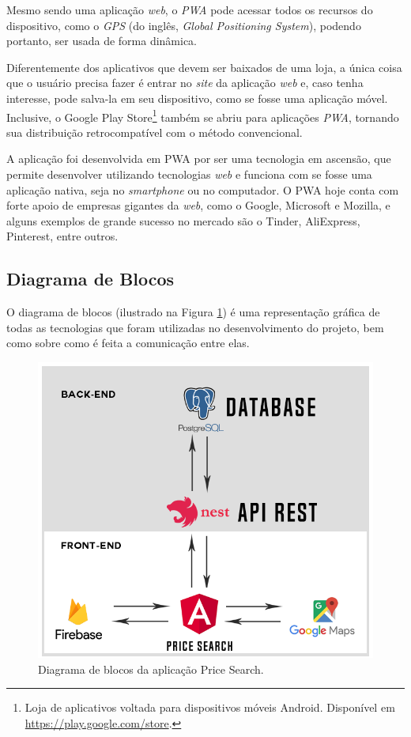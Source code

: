 Mesmo sendo uma aplicação \textit{web}, o \textit{PWA} pode acessar todos os recursos do dispositivo, como o \textit{GPS} (do inglês, \textit{Global Positioning System}), podendo portanto, ser usada de forma dinâmica.

Diferentemente dos aplicativos que devem ser baixados de uma loja, a única coisa que o usuário precisa fazer é entrar no \textit{site} da aplicação \textit{web} e, caso tenha interesse, pode salva-la em seu dispositivo, como se fosse uma aplicação móvel. Inclusive, o Google Play Store\footnote{Loja de aplicativos voltada para dispositivos móveis Android. Disponível em \url{https://play.google.com/store}.} também se abriu para aplicações \textit{PWA}, tornando sua distribuição retrocompatível com o método convencional.

A aplicação foi desenvolvida em PWA por ser uma tecnologia em ascensão, que permite desenvolver utilizando tecnologias \textit{web} e funciona com se fosse uma aplicação nativa, seja no \textit{smartphone} ou no computador. O PWA hoje conta com forte apoio de empresas gigantes da \textit{web}, como o Google, Microsoft e Mozilla, e alguns exemplos de grande sucesso no mercado são o Tinder, AliExpress, Pinterest, entre outros.

\subsection{Diagrama de Blocos}

 O diagrama de blocos (ilustrado na Figura  \ref{fig:diagrama_de_blocos}) é uma representação gráfica de todas as tecnologias que foram utilizadas no desenvolvimento do projeto, bem como sobre como é feita a comunicação entre elas.
 
\begin{figure}[!htb]
\centering
\includegraphics[width=\linewidth]{figuras/diagrama_de_blocos.png}
\caption{Diagrama de blocos da aplicação Price Search.}
\label{fig:diagrama_de_blocos}
\end{figure}
 

